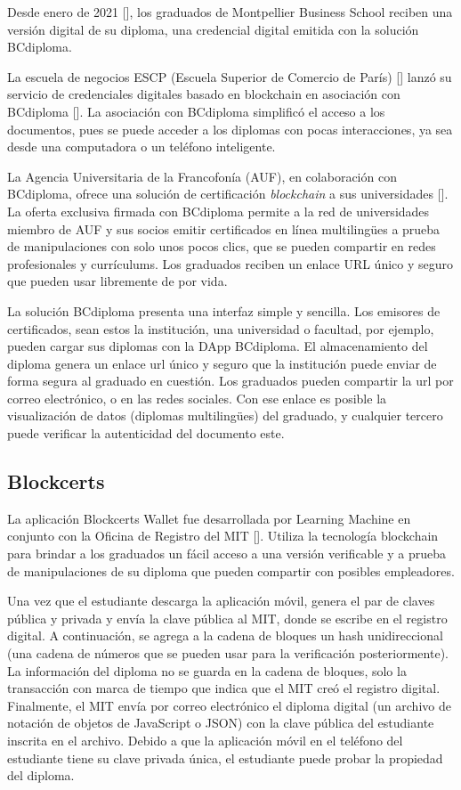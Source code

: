 Desde enero de 2021 [\cite{75, 78}], los graduados de Montpellier Business School reciben una versión digital de su diploma, una credencial digital emitida con la solución BCdiploma.

La escuela de negocios ESCP (Escuela Superior de Comercio de París) [\cite{74}] lanzó su servicio de credenciales digitales basado en blockchain en asociación con BCdiploma [\cite{75}]. La asociación con BCdiploma simplificó el acceso a los documentos, pues se puede acceder a los diplomas con pocas interacciones, ya sea desde una computadora o un teléfono inteligente.

La Agencia Universitaria de la Francofonía (AUF), en colaboración con BCdiploma, ofrece una solución de certificación \textit{blockchain} a sus universidades [\cite{77}]. La oferta exclusiva firmada con BCdiploma permite a la red de universidades miembro de AUF y sus socios emitir certificados en línea multilingües a prueba de manipulaciones con solo unos pocos clics, que se pueden compartir en redes profesionales y currículums. Los graduados reciben un enlace URL único y seguro que pueden usar libremente de por vida.

La solución BCdiploma presenta una interfaz simple y sencilla. Los emisores de certificados, sean estos la institución, una universidad o facultad, por ejemplo, pueden cargar sus diplomas con la DApp BCdiploma. El almacenamiento del diploma genera un enlace url único y seguro que la institución puede enviar de forma segura al graduado en cuestión. Los graduados pueden compartir la url por correo electrónico, o en las redes sociales. Con ese enlace es posible la visualización de datos (diplomas multilingües) del graduado, y cualquier tercero puede verificar la autenticidad del documento este. 

\subsection{Blockcerts}
La aplicación Blockcerts Wallet fue desarrollada por Learning Machine en conjunto con la Oficina de Registro del MIT [\cite{81, 79}]. Utiliza la tecnología blockchain para brindar a los graduados un fácil acceso a una versión verificable y a prueba de manipulaciones de su diploma que pueden compartir con posibles empleadores. %

Una vez que el estudiante descarga la aplicación móvil, genera el par de claves pública y privada y envía la clave pública al MIT, donde se escribe en el registro digital. A continuación, se agrega a la cadena de bloques un hash unidireccional (una cadena de números que se pueden usar para la verificación posteriormente). La información del diploma no se guarda en la cadena de bloques, solo la transacción con marca de tiempo que indica que el MIT creó el registro digital. Finalmente, el MIT envía por correo electrónico el diploma digital (un archivo de notación de objetos de JavaScript o JSON) con la clave pública del estudiante inscrita en el archivo. Debido a que la aplicación móvil en el teléfono del estudiante tiene su clave privada única, el estudiante puede probar la propiedad del diploma.

